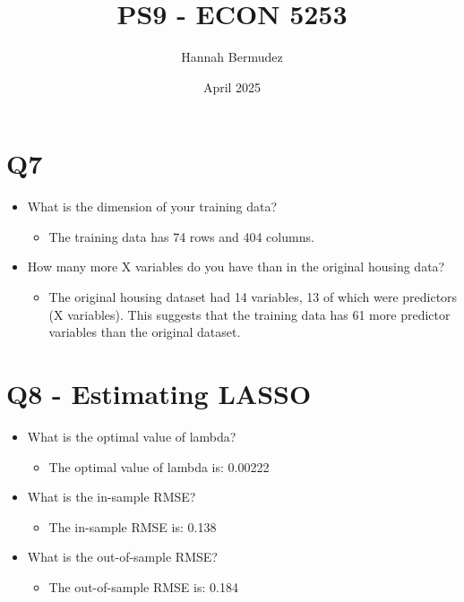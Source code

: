 \documentclass{article}
\title{PS9 - ECON 5253}
\author{Hannah Bermudez}
\date{April 2025}
\begin{document}
\maketitle

\section{Q7}

\begin{itemize}
    \item What is the dimension of your training data?
    \begin{itemize}
        \item The training data has 74 rows and 404 columns.
    \end{itemize}
    
    \item How many more X variables do you have than in the original housing data?
    \begin{itemize}
        \item The original housing dataset had 14 variables, 13 of which were predictors (X variables). This suggests that the training data has 61 more predictor variables than the original dataset.
    \end{itemize}
\end{itemize}

\section{Q8 - Estimating LASSO}

\begin{itemize}
    \item What is the optimal value of lambda?
    \begin{itemize}
        \item The optimal value of lambda is: 0.00222
    \end{itemize}

    \item What is the in-sample RMSE?
    \begin{itemize}
        \item The in-sample RMSE is: 0.138
    \end{itemize}

    \item What is the out-of-sample RMSE?
    \begin{itemize}
        \item The out-of-sample RMSE is: 0.184
    \end{itemize}
\end{itemize}
\end{document}
